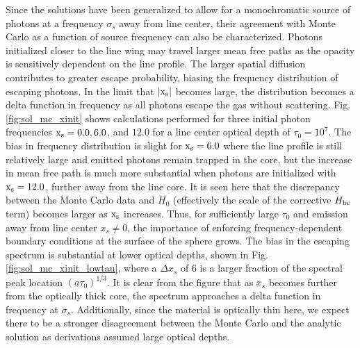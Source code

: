 \documentclass{aastex63}
\begin{document}
Since the solutions have been generalized to allow for a monochromatic source of photons at a frequency $\sigma_s$ away from line center, their agreement with Monte Carlo as a function of source frequency can also be characterized. Photons initialized closer to the line wing may travel larger mean free paths as the opacity is sensitively dependent on the line profile. The larger spatial diffusion contributes to greater escape probability, biasing the frequency distribution of escaping photons. In the limit that $|\rm x_s|$ becomes large, the distribution becomes a delta function in frequency as all photons escape the gas without scattering. Fig. \ref{fig:sol_mc_xinit} shows calculations performed for three initial photon frequencies $\rm x_s = 0.0, 6.0$, and $12.0$ for a line center optical depth of $\tau_0=10^7$. The bias in frequency distribution is slight for $\rm x_s = 6.0$ where the line profile is still relatively large and emitted photons remain trapped in the core, but the increase in mean free path is much more substantial when photons are initialized with $\rm x_s=12.0$, further away from the line core. It is seen here that the discrepancy between the Monte Carlo data and $H_0$ (effectively the scale of the corrective $H_{\rm bc}$ term) becomes larger as $\rm x_s$ increases. Thus, for sufficiently large $\tau_0$ and emission away from line center $x_s \neq 0$, the importance of enforcing frequency-dependent boundary conditions at the surface of the sphere grows. The bias in the escaping spectrum is substantial at lower optical depths, shown in Fig. \ref{fig:sol_mc_xinit_lowtau}, where a $\Delta x_s$ of 6 is a larger fraction of the spectral peak location $(a\tau_0)^{1/3}$. It is clear from the figure that as $x_s$ becomes further from the optically thick core, the spectrum approaches a delta function in frequency at $\sigma_s$. Additionally, since the material is optically thin here, we expect there to be a stronger disagreement between the Monte Carlo and the analytic solution as derivations assumed large optical depths.
\end{document}
